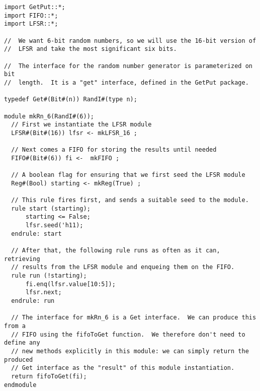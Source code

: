 \begin{verbatim}
import GetPut::*;
import FIFO::*;
import LFSR::*;

//  We want 6-bit random numbers, so we will use the 16-bit version of
//  LFSR and take the most significant six bits.

//  The interface for the random number generator is parameterized on bit
//  length.  It is a "get" interface, defined in the GetPut package.

typedef Get#(Bit#(n)) RandI#(type n);

module mkRn_6(RandI#(6));
  // First we instantiate the LFSR module
  LFSR#(Bit#(16)) lfsr <- mkLFSR_16 ;

  // Next comes a FIFO for storing the results until needed
  FIFO#(Bit#(6)) fi <-  mkFIFO ;

  // A boolean flag for ensuring that we first seed the LFSR module
  Reg#(Bool) starting <- mkReg(True) ;

  // This rule fires first, and sends a suitable seed to the module.
  rule start (starting);
      starting <= False;
      lfsr.seed('h11);
  endrule: start

  // After that, the following rule runs as often as it can, retrieving
  // results from the LFSR module and enqueing them on the FIFO.
  rule run (!starting);
      fi.enq(lfsr.value[10:5]);
      lfsr.next;
  endrule: run

  // The interface for mkRn_6 is a Get interface.  We can produce this from a
  // FIFO using the fifoToGet function.  We therefore don't need to define any
  // new methods explicitly in this module: we can simply return the produced
  // Get interface as the "result" of this module instantiation.
  return fifoToGet(fi);
endmodule
\end{verbatim}

